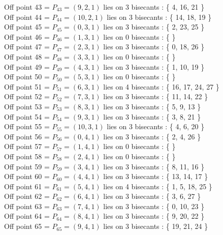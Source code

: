 \documentclass{article}
\begin{document}
{Off point 43 = $P_{43} = ( 9, 2, 1 )$ lies on 3 bisecants : \{ 4, 16, 21 \}\\
Off point 44 = $P_{44} = ( 10, 2, 1 )$ lies on 3 bisecants : \{ 14, 18, 19 \}\\
Off point 45 = $P_{45} = ( 0, 3, 1 )$ lies on 3 bisecants : \{ 2, 23, 25 \}\\
Off point 46 = $P_{46} = ( 1, 3, 1 )$ lies on 0 bisecants : \{  \}\\
Off point 47 = $P_{47} = ( 2, 3, 1 )$ lies on 3 bisecants : \{ 0, 18, 26 \}\\
Off point 48 = $P_{48} = ( 3, 3, 1 )$ lies on 0 bisecants : \{  \}\\
Off point 49 = $P_{49} = ( 4, 3, 1 )$ lies on 3 bisecants : \{ 1, 10, 19 \}\\
Off point 50 = $P_{50} = ( 5, 3, 1 )$ lies on 0 bisecants : \{  \}\\
Off point 51 = $P_{51} = ( 6, 3, 1 )$ lies on 4 bisecants : \{ 16, 17, 24, 27 \}\\
Off point 52 = $P_{52} = ( 7, 3, 1 )$ lies on 3 bisecants : \{ 11, 14, 22 \}\\
Off point 53 = $P_{53} = ( 8, 3, 1 )$ lies on 3 bisecants : \{ 5, 9, 13 \}\\
Off point 54 = $P_{54} = ( 9, 3, 1 )$ lies on 3 bisecants : \{ 3, 8, 21 \}\\
Off point 55 = $P_{55} = ( 10, 3, 1 )$ lies on 3 bisecants : \{ 4, 6, 20 \}\\
Off point 56 = $P_{56} = ( 0, 4, 1 )$ lies on 3 bisecants : \{ 2, 4, 26 \}\\
Off point 57 = $P_{57} = ( 1, 4, 1 )$ lies on 0 bisecants : \{  \}\\
Off point 58 = $P_{58} = ( 2, 4, 1 )$ lies on 0 bisecants : \{  \}\\
Off point 59 = $P_{59} = ( 3, 4, 1 )$ lies on 3 bisecants : \{ 8, 11, 16 \}\\
Off point 60 = $P_{60} = ( 4, 4, 1 )$ lies on 3 bisecants : \{ 13, 14, 17 \}\\
Off point 61 = $P_{61} = ( 5, 4, 1 )$ lies on 4 bisecants : \{ 1, 5, 18, 25 \}\\
Off point 62 = $P_{62} = ( 6, 4, 1 )$ lies on 3 bisecants : \{ 3, 6, 27 \}\\
Off point 63 = $P_{63} = ( 7, 4, 1 )$ lies on 3 bisecants : \{ 0, 10, 23 \}\\
Off point 64 = $P_{64} = ( 8, 4, 1 )$ lies on 3 bisecants : \{ 9, 20, 22 \}\\
Off point 65 = $P_{65} = ( 9, 4, 1 )$ lies on 3 bisecants : \{ 19, 21, 24 \}\\
}
\end{document}
